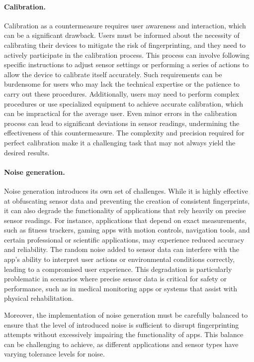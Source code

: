 \documentclass[11pt,
  oneside,openany,    %
]{scrreprt}
\begin{document}
\paragraph{Calibration.}
\label{par:calibration_disadvantage}
Calibration as a countermeasure requires user awareness and interaction, which can be a significant drawback. 
Users must be informed about the necessity of calibrating their devices to mitigate the risk of fingerprinting, and they need to actively participate in the calibration process. 
This process can involve following specific instructions to adjust sensor settings or performing a series of actions to allow the device to calibrate itself accurately. 
Such requirements can be burdensome for users who may lack the technical expertise or the patience to carry out these procedures. 
Additionally, users may need to perform complex procedures or use specialized equipment to achieve accurate calibration, which can be impractical for the average user. 
Even minor errors in the calibration process can lead to significant deviations in sensor readings, undermining the effectiveness of this countermeasure. 
The complexity and precision required for perfect calibration make it a challenging task that may not always yield the desired results.

\paragraph{Noise generation.}
\label{par:noise_disadvantage}
Noise generation introduces its own set of challenges. 
While it is highly effective at obfuscating sensor data and preventing the creation of consistent fingerprints, it can also degrade the functionality of applications that rely heavily on precise sensor readings. 
For instance, applications that depend on exact measurements, such as fitness trackers, gaming apps with motion controls, navigation tools, and certain professional or scientific applications, may experience reduced accuracy and reliability. 
The random noise added to sensor data can interfere with the app's ability to interpret user actions or environmental conditions correctly, leading to a compromised user experience. 
This degradation is particularly problematic in scenarios where precise sensor data is critical for safety or performance, such as in medical monitoring apps or systems that assist with physical rehabilitation.

Moreover, the implementation of noise generation must be carefully balanced to ensure that the level of introduced noise is sufficient to disrupt fingerprinting attempts without excessively impairing the functionality of apps. 
This balance can be challenging to achieve, as different applications and sensor types have varying tolerance levels for noise.
\end{document}
